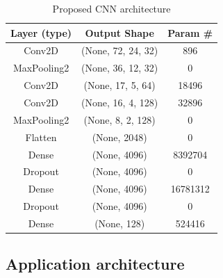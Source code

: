 \begin{table} [H]
	\centering
	\caption{Proposed CNN architecture}
	\begin{tabular}{ |c|c|c|} 
		\hline
		Layer (type) & Output Shape & Param \# \\ \hline
		Conv2D &  (None, 72, 24, 32) & 896 \\ \hline
		MaxPooling2 & (None, 36, 12, 32) & 0\\ \hline
		Conv2D & (None, 17, 5, 64) & 18496 \\ \hline
		Conv2D & (None, 16, 4, 128) & 32896 \\ \hline
		MaxPooling2 & (None, 8, 2, 128) & 0 \\ \hline
		Flatten & (None, 2048) & 0 \\ \hline
		Dense & (None, 4096) & 8392704 \\ \hline
		Dropout & (None, 4096) & 0 \\ \hline
		Dense & (None, 4096) & 16781312 \\ \hline
		Dropout & (None, 4096) & 0 \\ \hline
		Dense & (None, 128) & 524416 \\ \hline						
	\end{tabular}
	\label{table:cnn_architecture}
\end{table}
\newpage

\subsection{Application architecture}

